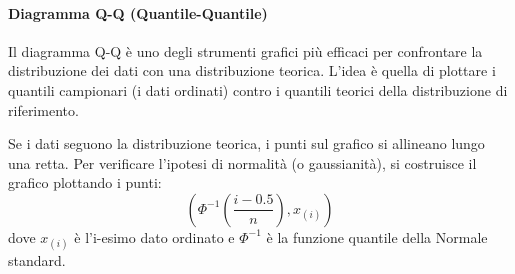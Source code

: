 \paragraph{Diagramma Q-Q (Quantile-Quantile)}
Il diagramma Q-Q è uno degli strumenti grafici più efficaci per confrontare la distribuzione dei dati con una distribuzione teorica. L'idea è quella di plottare i quantili campionari (i dati ordinati) contro i quantili teorici della distribuzione di riferimento.

Se i dati seguono la distribuzione teorica, i punti sul grafico si allineano lungo una retta. Per verificare l'ipotesi di normalità (o gaussianità), si costruisce il grafico plottando i punti:
\[
\left( \Phi^{-1}\left( \frac{i-0.5}{n} \right), x_{(i)} \right)
\]
dove \( x_{(i)} \) è l'i-esimo dato ordinato e \( \Phi^{-1} \) è la funzione quantile della Normale standard.

